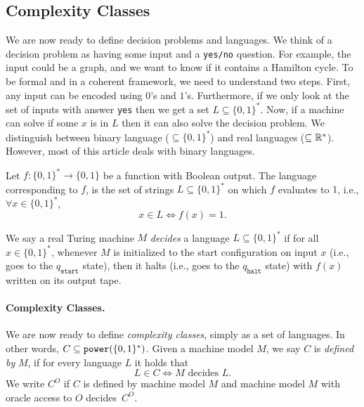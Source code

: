 \documentclass{article}
\begin{document}
\subsection{Complexity Classes}
\label{sec:ComplexityClasses}

We are now ready to define decision problems and languages.
We think of a decision problem as having some input and a \texttt{yes/no} question.
For example, the input could be a graph, and we want to know if it contains a Hamilton cycle.
To be formal and in a coherent framework, we need to understand two steps.
First, any input can be encoded using $0$'s and $1$'s.
Furthermore, if we only look at the set of inputs with answer \texttt{yes} then we 
get a set $L \subseteq \{0,1\}^*$.
Now, if a machine can solve if some $x$ is in $L$ then it can also solve the decision problem.
We distinguish between binary language ($\subseteq \{0,1\}^*$) and real languages ($\subseteq \mathbb{R}^*$).
However, most of this article deals with binary languages.

\begin{definition}
\label{def:FunctionNlanguageRecognition}
Let $f:\{0,1\}^{*} \rightarrow \{0,1\}$ be a function with Boolean output. 
The language corresponding to $f$, is the set of strings $L \subseteq \{0,1\}^{*}$ on which $f$ evaluates to $1$, i.e., $\forall x \in \{0,1\}^{*}$,
\begin{equation*}
    x \in L \iff f(x)=1.
\end{equation*}

We say a real Turing machine $M$ \emph{decides} a language $L \subseteq \{0,1\}^{*}$ if for all $x \in \{0,1\}^*$, whenever $M$ is initialized to the start configuration on input $x$ (i.e., goes to the $q_\texttt{start}$ state), then it halts (i.e., goes to the $q_\texttt{halt}$ state) with $f(x)$ written on its output tape.
\end{definition}

\paragraph{Complexity Classes.}
We are now ready to define \textit{complexity classes}, simply as a set of languages.
In other words, $C \subseteq \texttt{power}(\{0,1\}^*)$.
Given a machine model $M$, we say $C$ is \textit{defined by} $M$,
if for every language $L$ it holds that
\[L \in C \Leftrightarrow M \text{ decides } L.\]
We write $C^O$ if $C$ is defined by machine model $M$ and
machine model $M$ with oracle access to $O$ decides~$C^O$.
\end{document}
